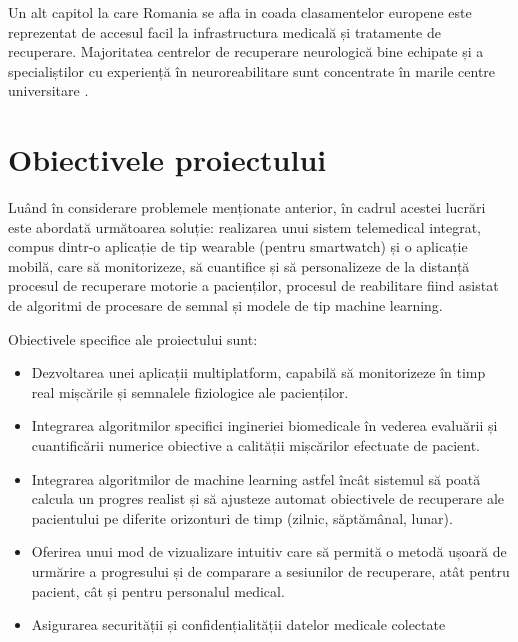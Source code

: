 \hspace{0.75cm}Un alt capitol la care Romania se afla in coada clasamentelor europene este reprezentat de accesul facil la 
infrastructura medicală și tratamente de recuperare. Majoritatea centrelor de recuperare neurologică bine echipate 
și a specialiștilor cu experiență în neuroreabilitare sunt concentrate în marile centre universitare \cite{tiu_2023}.

\section{Obiectivele proiectului}

\hspace{0.75cm} Luând în considerare problemele menționate anterior, în cadrul acestei lucrări este abordată 
următoarea soluție: realizarea unui sistem telemedical integrat, compus dintr-o aplicație de tip wearable (pentru smartwatch) 
și o aplicație mobilă, care să monitorizeze, să cuantifice și să personalizeze de la distanță procesul de recuperare motorie 
a pacienților, procesul de reabilitare fiind asistat de algoritmi de procesare de semnal și modele de tip machine learning.

\hspace{0.75cm}Obiectivele specifice ale proiectului sunt: 
\begin{itemize}
    \item Dezvoltarea unei aplicații multiplatform, capabilă să monitorizeze în 
     timp real mișcările și semnalele fiziologice ale pacienților.
    \item Integrarea algoritmilor specifici ingineriei biomedicale în vederea evaluării și cuantificării 
     numerice obiective a calității mișcărilor efectuate de pacient. 
    \item Integrarea algoritmilor de machine learning astfel încât sistemul să poată calcula un progres realist 
     și să ajusteze automat obiectivele de recuperare ale pacientului pe diferite orizonturi de timp
     (zilnic, săptămânal, lunar).
    \item Oferirea unui mod de vizualizare intuitiv care să permită o metodă ușoară de urmărire a 
     progresului și de comparare a sesiunilor de recuperare, atât pentru pacient, cât și pentru personalul medical. 
    \item Asigurarea securității și confidențialității datelor medicale colectate  
\end{itemize}
